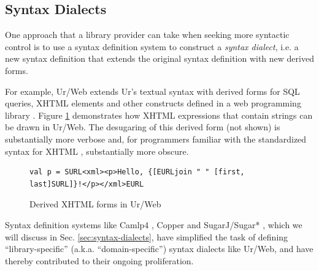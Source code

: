 \subsection{Syntax Dialects}\label{sec:problems-with-dialects}
One approach that a library provider can take when seeking more syntactic control is to use a syntax definition system to construct a \emph{syntax dialect}, i.e. a new syntax definition that extends the original syntax definition with new derived forms. 

For example, Ur/Web extends Ur's textual syntax with derived forms for SQL queries, XHTML elements and other constructs defined in a  web programming library \cite{conf/popl/Chlipala15,conf/pldi/Chlipala10}. Figure \ref{fig:urweb} demonstrates how XHTML expressions that contain strings can be drawn in Ur/Web. The desugaring of this derived form (not shown) is substantially more verbose and, for programmers familiar with the standardized syntax for XHTML \cite{xhtml}, substantially more obscure. %
\begin{figure}[h]
\begin{lstlisting}[numbers=none]
val p = SURL<xml><p>Hello, {[EURLjoin " " [first, last]SURL]}!</p></xml>EURL
\end{lstlisting}
\caption{Derived XHTML forms in Ur/Web}
\label{fig:urweb}
\end{figure}                           

Syntax definition systems like Camlp4 \cite{ocaml-manual}, Copper \cite{conf/gpce/WykS07} and SugarJ/Sugar* \cite{erdweg2011sugarj,erdweg2013framework}, which we will discuss in Sec. \ref{sec:syntax-dialects}, have simplified the task of defining ``library-specific'' (a.k.a. ``domain-specific'') syntax dialects like Ur/Web, and have thereby contributed to their ongoing proliferation.


